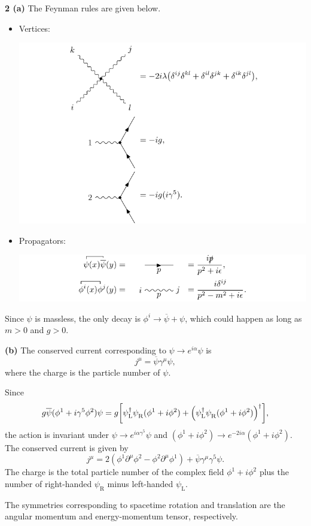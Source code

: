\documentclass{article}
\makeatletter
\newcommand*{\shifttext}[1]{%
  \settowidth{\@tempdima}{#1}%
  \hspace{-\@tempdima}#1%
}
\newcommand{\plabel}[1]{%
\shifttext{\textbf{#1}\quad}%
}
\makeatother
\begin{document}
\plabel{2 (a)}%
The Feynman rules are given below.
\begin{itemize}
  \item Vertices:
  \begin{center}
    \includegraphics{img/yukawa/unbroken/vertex/vertex.pdf}
  \end{center}
  \item Propagators:
  \begin{center}
    \includegraphics{img/yukawa/unbroken/propagator/propagator.pdf}
  \end{center}
\end{itemize}
Since $\psi$ is massless, the only decay is $\phi^i \rightarrow \overline{\psi}+\psi$, which could happen as long as $m > 0$ and $g > 0$.

\plabel{(b)}%
The conserved current corresponding to $\psi \rightarrow e^{i\alpha} \psi$ is
\[ j^\mu = \overline{\psi} \gamma^\mu \psi, \]
where the charge is the particle number of $\psi$.
\par
Since
\[ g\overline{\psi}(\phi^1 + i\gamma^5 \phi^2) \psi = g\qty[\psi_{\mathrm{L}}^\dagger \psi^{\vphantom{\dagger}}_{\mathrm{R}} (\phi^1 + i\phi^2) + \qty(\psi_{\mathrm{L}}^\dagger \psi^{\vphantom{\dagger}}_{\mathrm{R}} (\phi^1 + i\phi^2))^\dagger], \]
the action is invariant under $\psi \rightarrow e^{i\alpha \gamma^5} \psi$ and $(\phi^1 + i\phi^2) \rightarrow e^{-2i\alpha} (\phi^1 + i\phi^2)$.
The conserved current is given by
\[ j^\mu = 2(\phi^1 \partial^\mu \phi^2 - \phi^2 \partial^\mu \phi^1) + \overline{\psi}\gamma^\mu \gamma^5 \psi. \]
The charge is the total particle number of the complex field $\phi^1 + i\phi^2$ plus the number of right-handed $\psi_{\mathrm{R}}$ minus left-handed $\psi_{\mathrm{L}}$.
\par
The symmetries corresponding to spacetime rotation and translation are the angular momentum and energy-momentum tensor, respectively.
\end{document}

